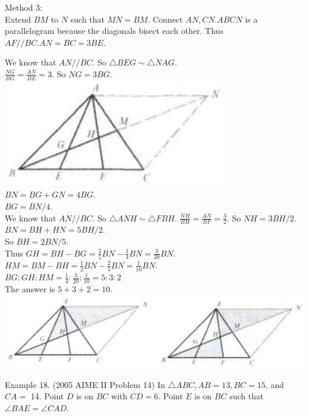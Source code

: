 \documentclass[10pt]{article}
\begin{document}
Method 3:\\
Extend \(B M\) to \(N\) such that \(M N=B M\). Connect \(A N, C N . A B C N\) is a parallelogram because the diagonals bisect each other. Thus \(A F / / B C . A N=B C=3 B E\).

We know that \(A N / / B C\). So \(\triangle B E G \sim \triangle N A G\).\\
\(\frac{N G}{B G}=\frac{A N}{B E}=3\). So \(N G=3 B G\).\\
\includegraphics[max width=\textwidth, center]{2025_04_17_97bc1f7e44d93c271a88g-120(1)}\\
\(B N=B G+G N=4 B G\).\\
\(B G=B N / 4\).\\
We know that \(A N / / B C\). So \(\triangle A N H \sim \triangle F B H\). \(\frac{N H}{B H}=\frac{A N}{B F}=\frac{3}{2}\). So \(N H=3 B H / 2\).\\
\(B N=B H+H N=5 B H / 2\).\\
So \(B H=2 B N / 5\).\\
Thus \(G H=B H-B G=\frac{2}{5} B N-\frac{1}{4} B N=\frac{3}{20} B N\).\\
\(H M=B M-B H=\frac{1}{2} B N-\frac{2}{5} B N=\frac{1}{10} B N\).\\
\(B G: G H: H M=\frac{1}{4}: \frac{3}{20}: \frac{1}{10}=5: 3: 2\)\\
The answer is \(5+3+2=10\).\\
\includegraphics[max width=\textwidth, center]{2025_04_17_97bc1f7e44d93c271a88g-120}


Example 18. (2005 AIME II Problem 14) In \(\triangle A B C, A B=13, B C=15\), and \(C A=\) 14. Point \(D\) is on \(B C\) with \(C D=6\). Point \(E\) is on \(B C\) such that \(\angle B A E=\angle C A D\).
\end{document}
